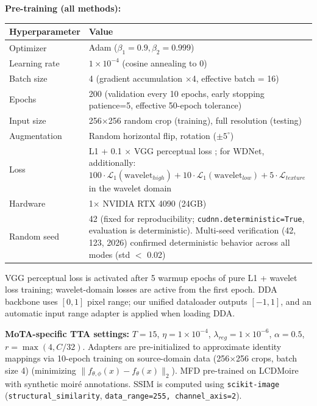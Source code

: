 \documentclass[review,10pt]{elsarticle}
\begin{document}
\textbf{Pre-training (all methods):}
\begin{center}
\footnotesize
\begin{tabular}{@{}lp{5.5cm}@{}}
\toprule
Hyperparameter & Value \\
\midrule
Optimizer & Adam ($\beta_1 = 0.9, \beta_2 = 0.999$) \\
Learning rate & $1 \times 10^{-4}$ (cosine annealing to 0) \\
Batch size & 4 (gradient accumulation $\times$4, effective batch = 16) \\
Epochs & 200 (validation every 10 epochs, early stopping patience=5, effective 50-epoch tolerance) \\
Input size & 256$\times$256 random crop (training), full resolution (testing) \\
Augmentation & Random horizontal flip, rotation ($\pm 5^\circ$) \\
Loss & L1 + 0.1 $\times$ VGG perceptual loss \cite{simonyan2014very}; for WDNet, additionally: $100\cdot\mathcal{L}_1(\text{wavelet}_{high}) + 10\cdot\mathcal{L}_1(\text{wavelet}_{low}) + 5\cdot\mathcal{L}_{texture}$ in the wavelet domain \\
Hardware & 1$\times$ NVIDIA RTX 4090 (24GB) \\
Random seed & 42 (fixed for reproducibility; \texttt{cudnn.deterministic=True}, evaluation is deterministic). Multi-seed verification (42, 123, 2026) confirmed deterministic behavior across all modes (std $<$ 0.02) \\
\bottomrule
\end{tabular}
\end{center}

VGG perceptual loss is activated after 5 warmup epochs of pure L1 + wavelet loss training; wavelet-domain losses are active from the first epoch. DDA backbone uses $[0,1]$ pixel range; our unified dataloader outputs $[-1,1]$, and an automatic input range adapter is applied when loading DDA.

\textbf{MoTA-specific TTA settings:} $T = 15$, $\eta = 1 \times 10^{-4}$, $\lambda_{reg} = 1\times 10^{-6}$, $\alpha = 0.5$, $r = \max(4, C/32)$. Adapters are pre-initialized to approximate identity mappings via 10-epoch training on source-domain data (256$\times$256 crops, batch size 4) (minimizing $\|f_{\theta,\phi}(x) - f_\theta(x)\|_2$). MFD pre-trained on LCDMoire with synthetic moir\'{e} annotations. SSIM is computed using \texttt{scikit-image} (\texttt{structural\_similarity}, \texttt{data\_range=255, channel\_axis=2}).
\end{document}
